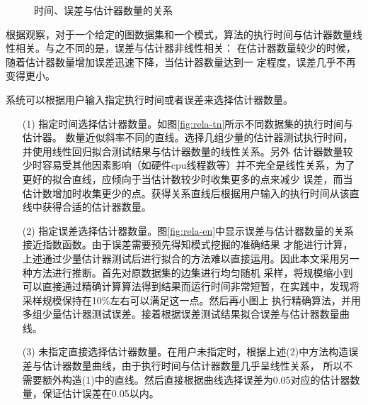 \documentclass[master]{thesis-uestc}
\begin{document}
\begin{figure}[t]
    \centering
    \caption{时间、误差与估计器数量的关系}
\end{figure}

    根据观察，对于一个给定的图数据集和一个模式，算法的执行时间与估计器数量线性相关。与之不同的是，误差与估计器非线性相关：
    在估计器数量较少的时候，随着估计器数量增加误差迅速下降，当估计器数量达到一
定程度，误差几乎不再变得更小。

    系统可以根据用户输入指定执行时间或者误差来选择估计器数量。

\begin{enumerate}
    \item[(1)] 指定时间选择估计器数量。如图\ref{fig:rela-tn}所示不同数据集的执行时间与估计器。
    数量近似斜率不同的直线。选择几组少量的估计器测试执行时间，并使用线性回归拟合测试结果与估计器数量的线性关系。另外
    估计器数量较少时容易受其他因素影响（如硬件cpu线程数等）并不完全是线性关系，为了更好的拟合直线，应倾向于当估计数较少时收集更多的点来减少
    误差，而当估计数增加时收集更少的点。获得关系直线后根据用户输入的执行时间从该直线中获得合适的估计器数量。

    \item[(2)] 指定误差选择估计器数量。图\ref{fig:rela-en}中显示误差与估计器数量的关系接近指数函数。由于误差需要预先得知模式挖掘的准确结果
    才能进行计算，上述通过少量估计器测试后进行拟合的方法难以直接运用。因此本文采用另一种方法进行推断。首先对原数据集的边集进行均匀随机
    采样，将规模缩小到可以直接通过精确计算算法得到结果而运行时间非常短暂，在实践中，发现将采样规模保持在10\%左右可以满足这一点。然后再小图上
    执行精确算法，并用多组少量估计器测试误差。接着根据误差测试结果拟合误差与估计器数量曲线。
    
    \item[(3)] 未指定直接选择估计器数量。在用户未指定时，根据上述(2)中方法构造误差与估计器数量曲线，由于执行时间与估计器数量几乎呈线性关系，
    所以不需要额外构造(1)中的直线。然后直接根据曲线选择误差为0.05对应的估计器数量，保证估计误差在0.05以内。

\end{enumerate}
\end{document}

